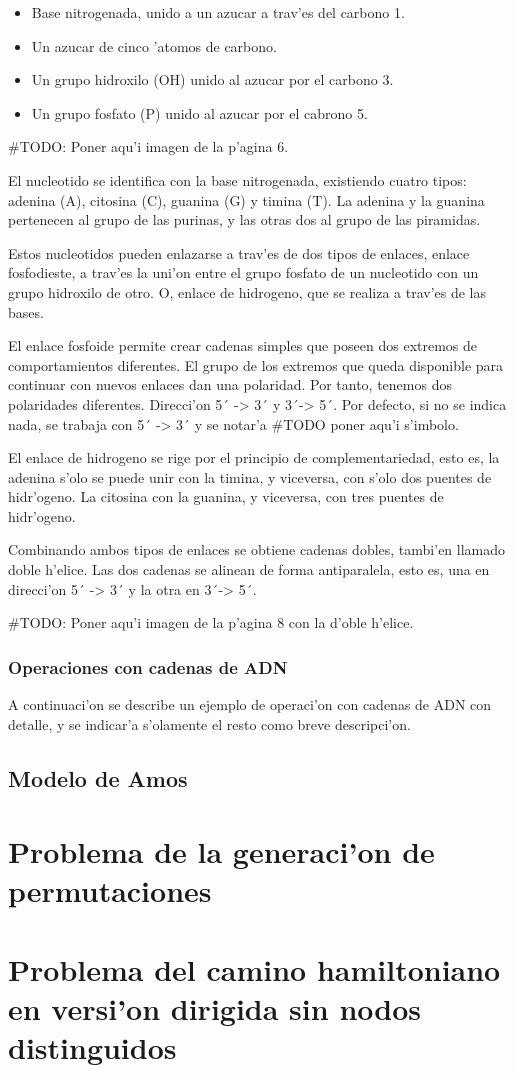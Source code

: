 \documentclass[12pt]{article}
\begin{document}
\begin{itemize}
	\item Base nitrogenada, unido a un azucar a trav'es del carbono 1.
	\item Un azucar de cinco 'atomos de carbono.
	\item Un grupo hidroxilo (OH) unido al azucar por el carbono 3.
	\item Un grupo fosfato (P) unido al azucar por el cabrono 5.
\end{itemize}

#TODO: Poner aqu'i imagen de la p'agina 6.

El nucleotido se identifica con la base nitrogenada, existiendo cuatro tipos: adenina (A), citosina (C),
guanina (G) y timina (T). La adenina y la guanina pertenecen al grupo de las purinas, y las otras dos
al grupo de las piramidas.

Estos nucleotidos pueden enlazarse a trav'es de dos tipos de enlaces, enlace fosfodieste, a trav'es
la uni'on entre el grupo fosfato de un nucleotido con un grupo hidroxilo de otro. O, enlace de hidrogeno,
que se realiza a trav'es de las bases.

El enlace fosfoide permite crear cadenas simples que poseen dos extremos de comportamientos diferentes. El grupo
de los extremos que queda disponible para continuar con nuevos enlaces dan una polaridad. Por tanto, tenemos dos
polaridades diferentes. Direcci'on 5´ -> 3´ y 3´-> 5´. Por defecto, si no se indica nada, se trabaja con 5´ -> 3´
y se notar'a #TODO poner aqu'i s'imbolo.

El enlace de hidrogeno se rige por el principio de complementariedad, esto es, la adenina s'olo se
puede unir con la timina, y viceversa, con s'olo dos puentes de hidr'ogeno. La citosina con la guanina,
 y viceversa, con tres puentes de hidr'ogeno.

 Combinando ambos tipos de enlaces se obtiene cadenas dobles, tambi'en llamado doble h'elice. Las dos cadenas
 se alinean de forma antiparalela, esto es, una en direcci'on 5´ -> 3´ y la otra en 3´-> 5´.

#TODO: Poner aqu'i imagen de la p'agina 8 con la d'oble h'elice.

\subsubsection{Operaciones con cadenas de ADN}

A continuaci'on se describe un ejemplo de operaci'on con cadenas de ADN con detalle, y se indicar'a s'olamente
el resto como breve descripci'on.



\subsection{Modelo de Amos}

\section{Problema de la generaci'on de permutaciones}

\section{Problema del camino hamiltoniano en versi'on dirigida sin nodos distinguidos}

\printbibliography
\end{document}
